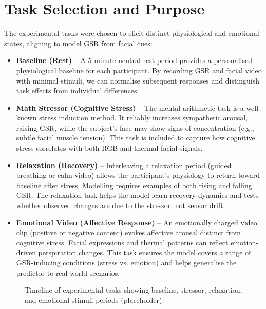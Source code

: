 \documentclass{article}
\begin{document}
\section{Task Selection and Purpose}
The experimental tasks were chosen to elicit distinct physiological and emotional states, aligning to model GSR from facial cues:
\begin{itemize}
    \item \textbf{Baseline (Rest)} -- A 5-minute neutral rest period provides a personalised physiological baseline for each participant. By recording GSR and facial video with minimal stimuli, we can normalise subsequent responses and distinguish task effects from individual differences.
    \item \textbf{Math Stressor (Cognitive Stress)} -- The mental arithmetic task is a well-known stress induction method. It reliably increases sympathetic arousal, raising GSR, while the subject’s face may show signs of concentration (e.g., subtle facial muscle tension). This task is included to capture how cognitive stress correlates with both RGB and thermal facial signals.
    \item \textbf{Relaxation (Recovery)} -- Interleaving a relaxation period (guided breathing or calm video) allows the participant’s physiology to return toward baseline after stress. Modelling requires examples of both rising and falling GSR. The relaxation task helps the model learn recovery dynamics and tests whether observed changes are due to the stressor, not sensor drift.
    \item \textbf{Emotional Video (Affective Response)} -- An emotionally charged video clip (positive or negative content) evokes affective arousal distinct from cognitive stress. Facial expressions and thermal patterns can reflect emotion-driven perspiration changes. This task ensures the model covers a range of GSR-inducing conditions (stress vs. emotion) and helps generalise the predictor to real-world scenarios.
\end{itemize}
\begin{figure}[h]
    \centering
    \caption{Timeline of experimental tasks showing baseline, stressor, relaxation, and emotional stimuli periods (placeholder).}
\end{figure}
\end{document}
